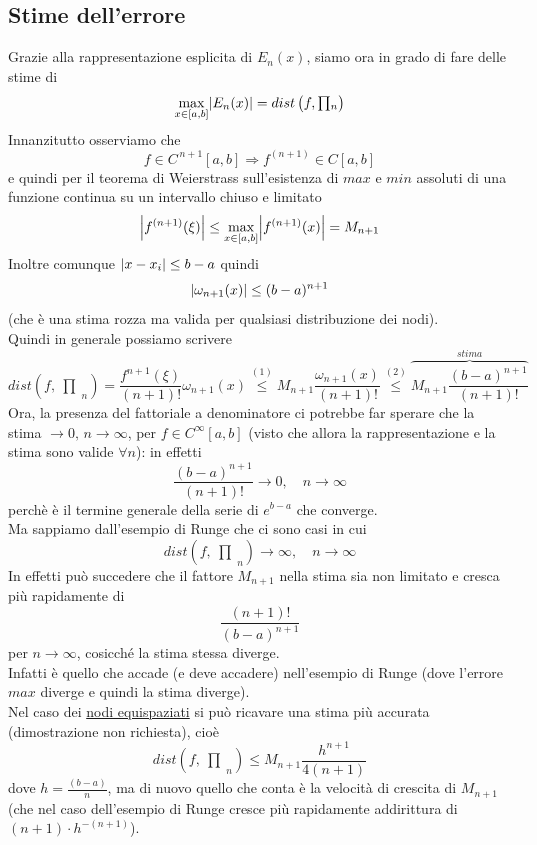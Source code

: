 \documentclass[12pt]{article}
\DeclarePairedDelimiter{\abs}{\lvert}{\rvert}
\newcommand{\inter}{\begin{matrix}\prod\end{matrix}}
\begin{document}
\subsection{Stime dell'errore}
Grazie alla rappresentazione esplicita di $E_n(x)$, siamo ora in grado di fare delle stime di
\[\max_{x \in [a,b]} \abs{E_n(x)} = dist\left(f, \inter_n\right)\]
Innanzitutto osserviamo che
\[f \in C^{\,n+1}[a,b] \Longrightarrow f^{(n+1)} \in C[a,b]\]
e quindi per il teorema di Weierstrass sull'esistenza di $max$ e $min$ assoluti di una funzione continua su un intervallo chiuso e limitato
\begin{equation}
    \abs*{f^{(n+1)}(\xi)} \le \max_{x \in [a,b]} \abs*{f^{(n+1)}(x)} = M_{n+1}
\end{equation}
Inoltre comunque $\abs{x-x_i} \le b-a$ quindi
\begin{equation}
    \abs*{\omega_{n+1}(x)} \le (b-a)^{n+1}
\end{equation}
(che è una stima rozza ma valida per qualsiasi distribuzione dei nodi).\\
Quindi in generale possiamo scrivere
\[dist\left(f,\inter_n \right)= \dfrac{f^{n+1}(\xi)}{(n+1)!} \omega_{n+1}(x) 
\overset{(1)}{\leq} M_{n+1} \dfrac{\omega_{n+1}(x)}{(n+1)!} \overset{(2)}{\leq} \overbrace{M_{n+1} \frac{(b-a)^{n+1}}{(n+1)!}}^{stima}\]
Ora, la presenza del fattoriale a denominatore ci potrebbe far sperare che la stima $\to 0,\, n \to \infty$, per $f \in C^{\infty}[a,b]$ (visto che allora la rappresentazione e la stima sono valide $\forall n$): in effetti
\[\frac{(b-a)^{n+1}}{(n+1)!} \to 0, \quad n \to \infty\]
perchè è il termine generale della serie di $e^{b-a}$ che converge.\\
Ma sappiamo dall'esempio di Runge che ci sono casi in cui
\[dist\left(f,\inter_n \right) \to \infty, \quad n \to \infty\]
In effetti può succedere che il fattore $M_{n+1}$ nella stima sia non limitato e cresca più rapidamente di 
\[ \frac{(n+1)!}{(b-a)^{n+1}} \]
per $n \to \infty$, cosicché la stima stessa diverge.\\
Infatti è quello che accade (e deve accadere) nell'esempio di Runge (dove l'errore $max$ diverge e quindi la stima diverge).\\
Nel caso dei \uline{nodi equispaziati} si può ricavare una stima più accurata (dimostrazione non richiesta), cioè
\[dist\left(f,\inter_n \right) \le M_{n+1} \frac{h^{n+1}}{4(n+1)}\]
dove $h = \frac{(b-a)}{n}$, ma di nuovo quello che conta è la velocità di crescita di $M_{n+1}$ (che nel caso dell'esempio di Runge cresce più rapidamente addirittura di $(n+1) \cdot h^{-(n+1)}$).\\
\end{document}
